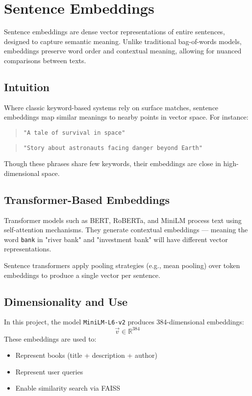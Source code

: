 \chapter{Sentence Embeddings}
\label{appendix:sentence-embeddings}

Sentence embeddings are dense vector representations of entire sentences, designed to capture semantic meaning. Unlike traditional bag-of-words models, embeddings preserve word order and contextual meaning, allowing for nuanced comparisons between texts.

\section*{Intuition}
Where classic keyword-based systems rely on surface matches, sentence embeddings map similar meanings to nearby points in vector space. For instance:

\begin{quote}
\texttt{"A tale of survival in space"}
\end{quote}
\begin{quote}
\texttt{"Story about astronauts facing danger beyond Earth"}
\end{quote}

Though these phrases share few keywords, their embeddings are close in high-dimensional space.

\section*{Transformer-Based Embeddings}
Transformer models such as BERT, RoBERTa, and MiniLM process text using self-attention mechanisms. They generate contextual embeddings — meaning the word \texttt{bank} in "river bank" and "investment bank" will have different vector representations.

Sentence transformers apply pooling strategies (e.g., mean pooling) over token embeddings to produce a single vector per sentence.

\section*{Dimensionality and Use}
In this project, the model \texttt{MiniLM-L6-v2} produces 384-dimensional embeddings:
\[ \vec{v} \in \mathbb{R}^{384} \]
These embeddings are used to:
\begin{itemize}
  \item Represent books (title + description + author)
  \item Represent user queries
  \item Enable similarity search via FAISS
\end{itemize}

